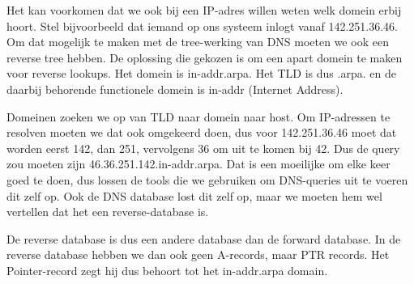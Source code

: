 Het kan voorkomen dat we ook bij een IP-adres willen weten welk domein erbij hoort. Stel bijvoorbeeld dat iemand op ons systeem inlogt vanaf 142.251.36.46. Om dat mogelijk te maken met de tree-werking van DNS moeten we ook een reverse tree hebben. De oplossing die gekozen is om een apart domein te maken voor reverse lookups. Het domein is in-addr.arpa. Het TLD is dus .arpa. en de daarbij behorende functionele domein is in-addr (Internet Address).

Domeinen zoeken we op van TLD naar domein naar host. Om IP-adressen te resolven moeten we dat ook omgekeerd doen, dus voor 142.251.36.46 moet dat worden eerst 142, dan 251, vervolgens 36 om uit te komen bij 42. Dus de query zou moeten zijn 46.36.251.142.in-addr.arpa. Dat is een moeilijke om elke keer goed te doen, dus lossen de tools die we gebruiken om DNS-queries uit te voeren dit zelf op. Ook de DNS database lost dit zelf op, maar we moeten hem wel vertellen dat het een reverse-database is.

De reverse database is dus een andere database dan de forward database. In de reverse database hebben we dan ook geen A-records, maar PTR records. Het Pointer-record zegt hij dus behoort tot het in-addr.arpa domain.

